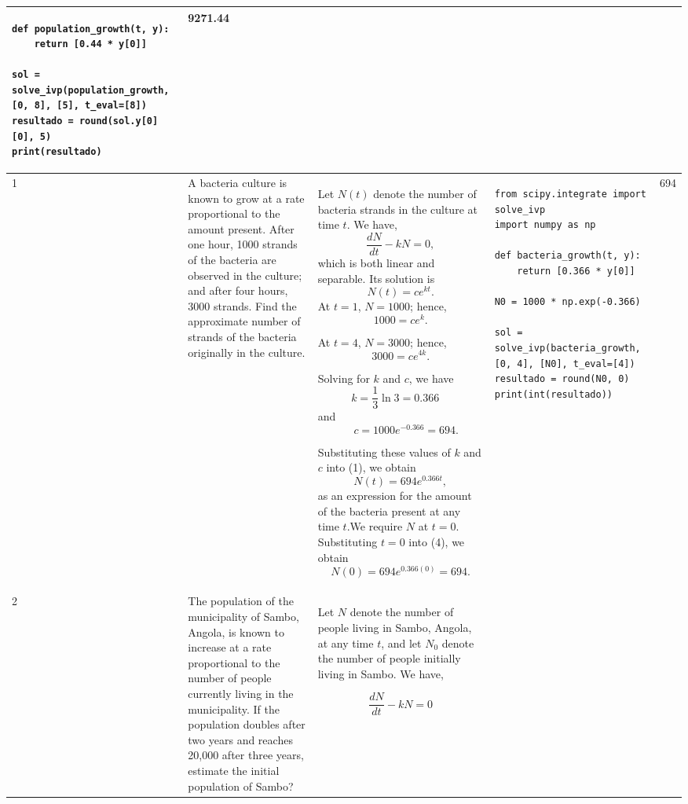 \documentclass[a4paper,12pt]{article}
\begin{document}
\begin{longtable}{|p{0.3cm}|p{}|p{10cm}|p{}|p{1.5cm}|}
\begin{verbatim}
def population_growth(t, y):
    return [0.44 * y[0]]

sol = solve_ivp(population_growth, [0, 8], [5], t_eval=[8])
resultado = round(sol.y[0][0], 5)
print(resultado)
\end{verbatim}
&     9271.44            \\ \hline
    1             &  A bacteria culture is known to grow at a rate proportional to the amount present. After one hour, 1000 strands of the bacteria are observed in the culture; and after four hours, 3000 strands. Find the approximate number of strands of the bacteria originally in the culture.         &  Let $N(t)$ denote the number of bacteria strands in the culture at time $t$.
We have,
\[
\frac{dN}{dt} - kN = 0,
\]
which is both linear and separable. Its solution is
\[
N(t) = ce^{kt}.
\]
At $t = 1$, $N = 1000$; hence,
$$
1000 = ce^{k}.
$$

At $t = 4$, $N = 3000$; hence,
$$
3000 = ce^{4k}.
$$

Solving  for $k$ and $c$, we have
\[k = \frac{1}{3}\ln 3 = 0.366 \quad\] and  \[\quad c = 1000e^{-0.366} = 694.\]

Substituting these values of $k$ and $c$ into (1), we obtain
$$
N(t) = 694e^{0.366t},
$$
as an expression for the amount of the bacteria present at any time $t$.We require $N$ at $t = 0$. Substituting $t = 0$ into (4), we obtain
$$
N(0) = 694e^{0.366(0)} = 694.
$$&
\begin{verbatim}
from scipy.integrate import solve_ivp
import numpy as np

def bacteria_growth(t, y):
    return [0.366 * y[0]]

N0 = 1000 * np.exp(-0.366)

sol = solve_ivp(bacteria_growth, [0, 4], [N0], t_eval=[4])
resultado = round(N0, 0)
print(int(resultado))
\end{verbatim}&  694              \\ \hline
     2 & The population of the municipality of Sambo, Angola, is known to increase at a rate proportional to the number of people currently living in the municipality. If the population doubles after two years and reaches 20,000 after three years, estimate the initial population of Sambo?                 & 

Let \( N \) denote the number of people living in Sambo, Angola, at any time \( t \), and let \( N_0 \) denote the number of people initially living in Sambo. We have,

\[
\frac{dN}{dt} - kN = 0
\]


\end{longtable}
\end{document}
